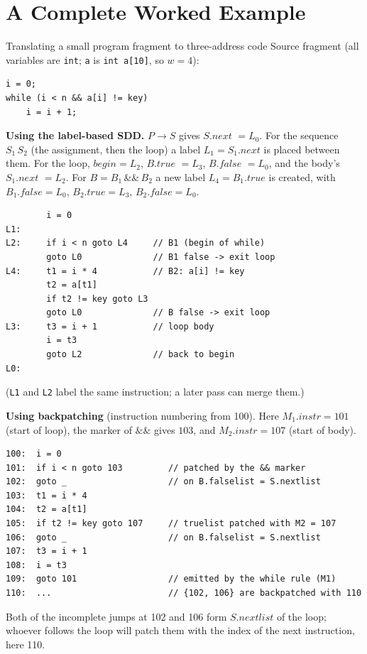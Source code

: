 \documentclass[11pt,a4paper]{article}
\newcommand{\at}[2]{\ensuremath{#1.\mathit{#2}}}
\begin{document}

\section{A Complete Worked Example}

\begin{examplebox}{Translating a small program fragment to three-address code}
Source fragment (all variables are \texttt{int}; \texttt{a} is \texttt{int a[10]}, so $w=4$):
\begin{lstlisting}
i = 0;
while (i < n && a[i] != key)
    i = i + 1;
\end{lstlisting}

\textbf{Using the label-based SDD.} $P \to S$ gives \at{S}{next} $=L_0$. For the sequence $S_1\,S_2$ (the assignment, then the loop) a label $L_1 = \at{S_1}{next}$ is placed between them. For the loop, $\mathit{begin}=L_2$, \at{B}{true} $=L_3$, \at{B}{false} $=L_0$, and the body's \at{S_1}{next} $= L_2$. For $B = B_1 \,\&\&\, B_2$ a new label $L_4 = B_1.\mathit{true}$ is created, with $B_1.\mathit{false}=L_0$, $B_2.\mathit{true}=L_3$, $B_2.\mathit{false}=L_0$.

\begin{lstlisting}
        i = 0
L1:
L2:     if i < n goto L4     // B1 (begin of while)
        goto L0              // B1 false -> exit loop
L4:     t1 = i * 4           // B2: a[i] != key
        t2 = a[t1]
        if t2 != key goto L3
        goto L0              // B false -> exit loop
L3:     t3 = i + 1           // loop body
        i = t3
        goto L2              // back to begin
L0:
\end{lstlisting}
(\texttt{L1} and \texttt{L2} label the same instruction; a later pass can merge them.)

\textbf{Using backpatching} (instruction numbering from 100). Here $M_1.\mathit{instr}=101$ (start of loop), the marker of $\&\&$ gives $103$, and $M_2.\mathit{instr}=107$ (start of body).
\begin{lstlisting}
100:  i = 0
101:  if i < n goto 103         // patched by the && marker
102:  goto _                    // on B.falselist = S.nextlist
103:  t1 = i * 4
104:  t2 = a[t1]
105:  if t2 != key goto 107     // truelist patched with M2 = 107
106:  goto _                    // on B.falselist = S.nextlist
107:  t3 = i + 1
108:  i = t3
109:  goto 101                  // emitted by the while rule (M1)
110:  ...                       // {102, 106} are backpatched with 110
\end{lstlisting}
Both of the incomplete jumps at 102 and 106 form \at{S}{nextlist} of the loop; whoever follows the loop will patch them with the index of the next instruction, here 110.
\end{examplebox}
\end{document}

